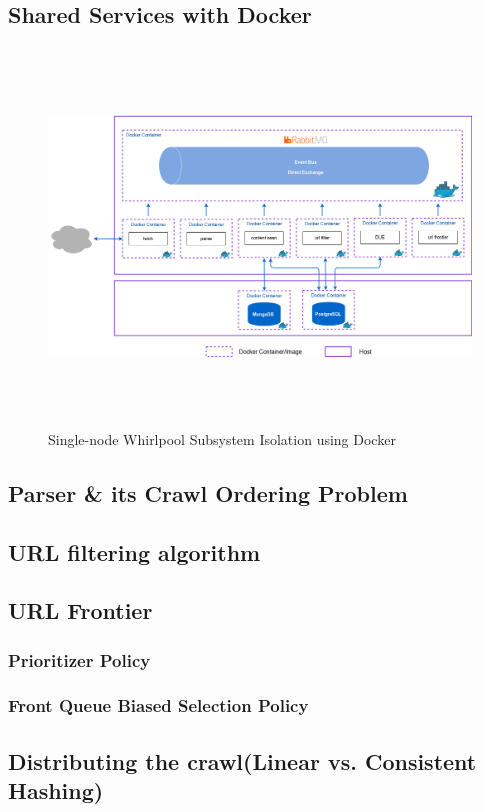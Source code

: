 \subsection{Shared Services with Docker}
\begin{figure}[h!]
  \centering
  \includegraphics[width=18cm,height=10cm,keepaspectratio]{../media/crawler/multi-container-deploy.png}
  \caption{Single-node Whirlpool Subsystem Isolation using Docker}
  \label{fig:multicontainer}
\end{figure}


\pagebreak

\subsection{Parser \& its Crawl Ordering Problem}
\subsection{URL filtering algorithm}
\subsection{URL Frontier}
\subsubsection{Prioritizer Policy}\label{priotizer}
\subsubsection{Front Queue Biased Selection Policy}\label{fqbiased}
\subsection{Distributing the crawl(Linear vs. Consistent Hashing)}

\pagebreak